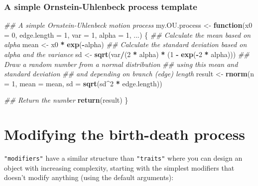 \documentclass[
]{book}
\newenvironment{Shaded}{\begin{snugshade}}{\end{snugshade}}
\newcommand{\CommentTok}[1]{\textcolor[rgb]{0.56,0.35,0.01}{\textit{#1}}}
\newcommand{\ControlFlowTok}[1]{\textcolor[rgb]{0.13,0.29,0.53}{\textbf{#1}}}
\newcommand{\DataTypeTok}[1]{\textcolor[rgb]{0.13,0.29,0.53}{#1}}
\newcommand{\DecValTok}[1]{\textcolor[rgb]{0.00,0.00,0.81}{#1}}
\newcommand{\KeywordTok}[1]{\textcolor[rgb]{0.13,0.29,0.53}{\textbf{#1}}}
\newcommand{\NormalTok}[1]{#1}
\newcommand{\OperatorTok}[1]{\textcolor[rgb]{0.81,0.36,0.00}{\textbf{#1}}}
\newcommand{\StringTok}[1]{\textcolor[rgb]{0.31,0.60,0.02}{#1}}
\begin{document}
\hypertarget{a-simple-ornstein-uhlenbeck-process-template}{%
\subsection{A simple Ornstein-Uhlenbeck process template}\label{a-simple-ornstein-uhlenbeck-process-template}}

\begin{Shaded}
\begin{Highlighting}[]
\CommentTok{\#\# A simple Ornstein{-}Uhlenbeck motion process}
\NormalTok{my.OU.process \textless{}{-}}\StringTok{ }\ControlFlowTok{function}\NormalTok{(}\DataTypeTok{x0 =} \DecValTok{0}\NormalTok{, }\DataTypeTok{edge.length =} \DecValTok{1}\NormalTok{, }\DataTypeTok{var =} \DecValTok{1}\NormalTok{, }\DataTypeTok{alpha =} \DecValTok{1}\NormalTok{, ...) \{}
    \CommentTok{\#\# Calculate the mean based on alpha}
\NormalTok{    mean \textless{}{-}}\StringTok{ }\NormalTok{x0 }\OperatorTok{*}\StringTok{ }\KeywordTok{exp}\NormalTok{(}\OperatorTok{{-}}\NormalTok{alpha)}
    \CommentTok{\#\# Calculate the standard deviation based on alpha and the variance}
\NormalTok{    sd \textless{}{-}}\StringTok{ }\KeywordTok{sqrt}\NormalTok{(var}\OperatorTok{/}\NormalTok{(}\DecValTok{2} \OperatorTok{*}\StringTok{ }\NormalTok{alpha) }\OperatorTok{*}\StringTok{ }\NormalTok{(}\DecValTok{1} \OperatorTok{{-}}\StringTok{ }\KeywordTok{exp}\NormalTok{(}\OperatorTok{{-}}\DecValTok{2} \OperatorTok{*}\StringTok{ }\NormalTok{alpha)))}
    \CommentTok{\#\# Draw a random number from a normal distribution}
    \CommentTok{\#\# using this mean and standard deviation}
    \CommentTok{\#\# and depending on branch (edge) length}
\NormalTok{    result \textless{}{-}}\StringTok{ }\KeywordTok{rnorm}\NormalTok{(}\DataTypeTok{n =} \DecValTok{1}\NormalTok{, }\DataTypeTok{mean =}\NormalTok{ mean, }\DataTypeTok{sd =} \KeywordTok{sqrt}\NormalTok{(sd}\OperatorTok{\^{}}\DecValTok{2} \OperatorTok{*}\StringTok{ }\NormalTok{edge.length))}

    \CommentTok{\#\# Return the number}
    \KeywordTok{return}\NormalTok{(result)}
\NormalTok{\}}
\end{Highlighting}
\end{Shaded}

\hypertarget{makemodifiers}{%
\chapter{Modifying the birth-death process}\label{makemodifiers}}

\texttt{"modifiers"} have a similar structure than \texttt{"traits"} where you can design an object with increasing complexity, starting with the simplest modifiers that doesn't modify anything (using the default arguments):
\end{document}
